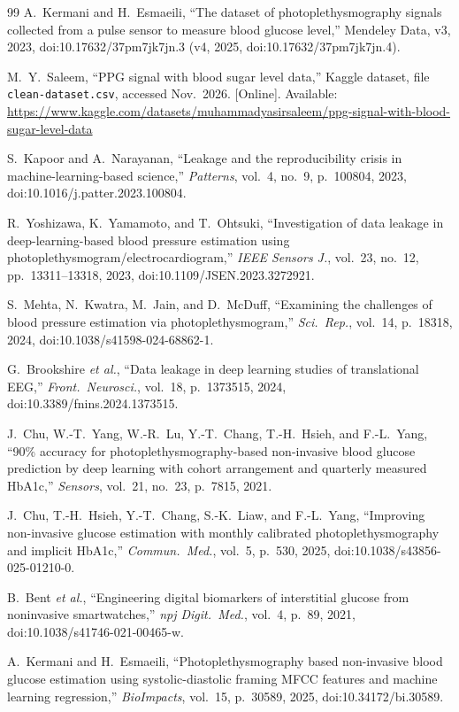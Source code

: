 \documentclass[journal]{IEEEtran}
\begin{document}
\begin{thebibliography}{99}
A.~Kermani and H.~Esmaeili, ``The dataset of photoplethysmography signals
collected from a pulse sensor to measure blood glucose level,'' Mendeley
Data, v3, 2023, doi:10.17632/37pm7jk7jn.3 (v4, 2025, doi:10.17632/37pm7jk7jn.4).

M.~Y.~Saleem, ``PPG signal with blood sugar level data,'' Kaggle dataset,
file \texttt{clean-dataset.csv}, accessed Nov.\ 2026.
[Online]. Available: \url{https://www.kaggle.com/datasets/muhammadyasirsaleem/ppg-signal-with-blood-sugar-level-data}

S.~Kapoor and A.~Narayanan, ``Leakage and the reproducibility crisis in
machine-learning-based science,'' \emph{Patterns}, vol.~4, no.~9,
p.~100804, 2023, doi:10.1016/j.patter.2023.100804.

R.~Yoshizawa, K.~Yamamoto, and T.~Ohtsuki, ``Investigation of data leakage
in deep-learning-based blood pressure estimation using
photoplethysmogram/electrocardiogram,'' \emph{IEEE Sensors J.}, vol.~23,
no.~12, pp.~13311--13318, 2023, doi:10.1109/JSEN.2023.3272921.

S.~Mehta, N.~Kwatra, M.~Jain, and D.~McDuff, ``Examining the challenges of
blood pressure estimation via photoplethysmogram,'' \emph{Sci.\ Rep.},
vol.~14, p.~18318, 2024, doi:10.1038/s41598-024-68862-1.

G.~Brookshire \emph{et al.}, ``Data leakage in deep learning studies of
translational EEG,'' \emph{Front.\ Neurosci.}, vol.~18, p.~1373515, 2024,
doi:10.3389/fnins.2024.1373515.

J.~Chu, W.-T.~Yang, W.-R.~Lu, Y.-T.~Chang, T.-H.~Hsieh, and F.-L.~Yang,
``90\% accuracy for photoplethysmography-based
non-invasive blood glucose prediction by deep learning with cohort
arrangement and quarterly measured HbA1c,'' \emph{Sensors}, vol.~21, no.~23,
p.~7815, 2021.

J.~Chu, T.-H.~Hsieh, Y.-T.~Chang, S.-K.~Liaw, and F.-L.~Yang,
``Improving non-invasive glucose estimation with
monthly calibrated photoplethysmography and implicit HbA1c,''
\emph{Commun.\ Med.}, vol.~5, p.~530, 2025, doi:10.1038/s43856-025-01210-0.

B.~Bent \emph{et al.}, ``Engineering digital biomarkers of interstitial
glucose from noninvasive smartwatches,'' \emph{npj Digit.\ Med.}, vol.~4,
p.~89, 2021, doi:10.1038/s41746-021-00465-w.

A.~Kermani and H.~Esmaeili, ``Photoplethysmography based non-invasive blood
glucose estimation using systolic-diastolic framing MFCC features and
machine learning regression,'' \emph{BioImpacts}, vol.~15, p.~30589, 2025,
doi:10.34172/bi.30589.


\end{thebibliography}
\end{document}
